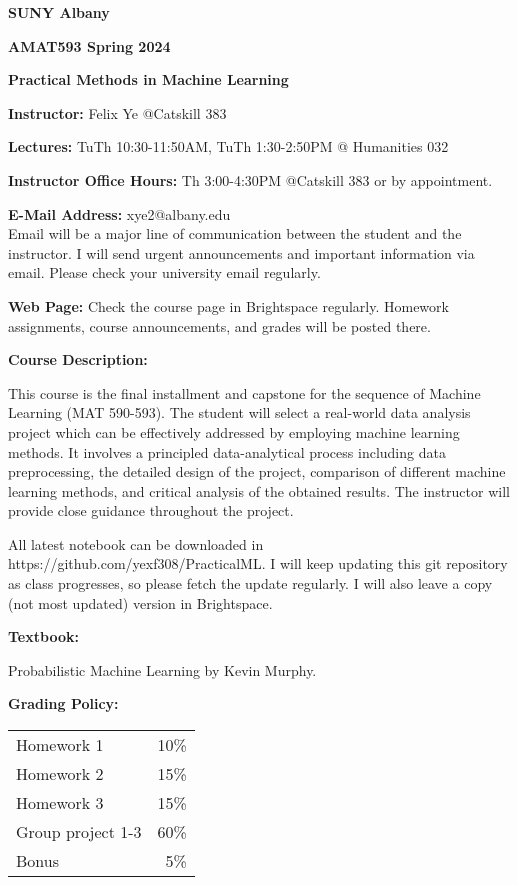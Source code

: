 \documentclass[a4paper,10pt]{article}
\begin{document}
\begin{center}

\textbf{SUNY Albany}

\textbf{AMAT593 Spring 2024}

\textbf{Practical Methods in Machine Learning}


\end{center}

\textbf{Instructor:} Felix Ye @Catskill 383 

\textbf{Lectures:} TuTh 10:30-11:50AM, TuTh 1:30-2:50PM @ Humanities 032

\textbf{Instructor Office Hours:}   Th 3:00-4:30PM  @Catskill 383 or by appointment. 


\textbf{E-Mail Address:} xye2@albany.edu\\
Email will be a major line of communication between the student and the instructor. I will send urgent announcements and important information via email. Please check your university email regularly.

\textbf{Web Page:}
Check the course page in Brightspace regularly. Homework assignments, course announcements, and grades will be posted there.


\textbf{Course Description:} 	
	
	
This course is the final installment and capstone for the sequence of Machine Learning (MAT 590-593).  The student will select a real-world data analysis project which can be effectively addressed by employing machine learning methods.  It involves a principled data-analytical process including data preprocessing, the detailed design of the project, comparison of different machine learning methods, and critical analysis of the obtained results.  The instructor will provide close guidance throughout the project. 

All latest notebook can be downloaded in https://github.com/yexf308/PracticalML. I will keep updating this git repository as class progresses, so please fetch the update regularly. I will also leave a copy (not most updated) version in Brightspace. 
 

\textbf{Textbook:} 

Probabilistic Machine Learning by Kevin Murphy.

\textbf{Grading Policy:}

\begin{tabular}{lr}
Homework 1 & 10\%\\
Homework 2 & 15\%\\
Homework 3 & 15\%\\
Group project 1-3 & 60\% \\ 
Bonus & 5\%
\end{tabular}
\end{document}
